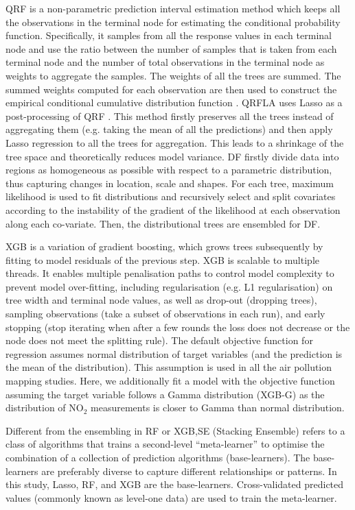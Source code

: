 \documentclass{article}
\begin{document}
QRF is a non-parametric prediction interval estimation method which keeps all the observations in the terminal node for estimating the conditional probability function. Specifically, it samples from all the response values in each terminal node and use the ratio between the number of samples that is taken from each terminal node and the number of total observations in the terminal node as weights to aggregate the samples. The weights of all the trees are summed. The summed weights computed for each observation are then used to construct the empirical conditional cumulative distribution function \citep{meinshausen2006quantile}. QRFLA uses Lasso as a post-processing of QRF \citep[][page 617]{hastie2017elements}. This method firstly preserves all the trees instead of aggregating them (e.g. taking the mean of all the predictions) and then apply Lasso regression to all the trees for aggregation. This leads to a shrinkage of the tree space and theoretically reduces model variance. DF \citep{schlosser2019distributional} firstly divide data into regions as homogeneous as possible with respect to a parametric distribution, thus capturing changes in location, scale and shapes. For each tree, maximum likelihood is used to fit distributions and recursively select and split covariates according to the instability of the gradient of the likelihood at each observation along each co-variate. Then, the distributional trees are ensembled for DF.

XGB is a variation of gradient boosting, which grows trees subsequently by fitting to model residuals of the previous step. XGB is scalable to multiple threads. It enables multiple penalisation paths to control model complexity to prevent model over-fitting, including regularisation (e.g. L1 regularisation) on tree width and terminal node values, as well as drop-out (dropping trees), sampling observations (take a subset of observations in each run), and early stopping (stop iterating when after a few rounds the loss does not decrease or the node does not meet the splitting rule). The default objective function for regression assumes normal distribution of target variables (and the prediction is the mean of the distribution). This assumption is used in all the air pollution mapping studies. Here, we additionally fit a model with the objective function assuming the target variable follows a Gamma distribution (XGB-G) as the distribution of NO$_2$ measurements is closer to Gamma than normal distribution.  

Different from the ensembling in RF or XGB,SE (Stacking Ensemble) refers to a class of algorithms that trains a second-level “meta-learner” to optimise the combination of a collection of prediction algorithms (base-learners). The base-learners are preferably diverse to capture different relationships or patterns. In this study, Lasso, RF, and XGB are the base-learners. Cross-validated predicted values (commonly known as level-one data) are used to train the meta-learner.  
\end{document}
